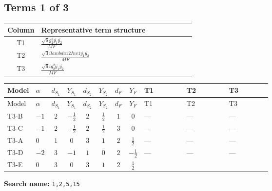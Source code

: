 \documentclass[8pt]{article}
\begin{document}
\begin{landscape}
\subsection*{Terms 1 of 3}
\begin{center}
\begin{tabular}{@{}c >{\raggedright\arraybackslash}p{0.82\linewidth}@{}}
\toprule
Column & Representative term structure \\
\midrule
T1 & \(\displaystyle \frac{\sqrt{6} g_{2}^{2} \overline{y_{1}} \overline{y_{2}}}{MF}\) \\
\midrule
T2 & \(\displaystyle \frac{\sqrt{3} i lambda12Inv1 \overline{y_{1}} \overline{y_{2}}}{MF}\) \\
\midrule
T3 & \(\displaystyle \frac{\sqrt{6} i g_{2}^{2} \overline{y_{1}} \overline{y_{2}}}{MF}\) \\
\midrule
\bottomrule
\end{tabular}
\end{center}
\smallskip
\tiny
\begin{longtable}{@{}llcccccc >{\raggedright\arraybackslash}p{0.21\linewidth} >{\raggedright\arraybackslash}p{0.21\linewidth} >{\raggedright\arraybackslash}p{0.21\linewidth}@{}}
\toprule
Model & $\alpha$ & $d_{S_1}$ & $Y_{S_1}$ & $d_{S_2}$ & $Y_{S_2}$ & $d_F$ & $Y_F$ & T1 & T2 & T3 \\
\midrule
\endfirsthead
\toprule
Model & $\alpha$ & $d_{S_1}$ & $Y_{S_1}$ & $d_{S_2}$ & $Y_{S_2}$ & $d_F$ & $Y_F$ & T1 & T2 & T3 \\
\midrule
\endhead
T3-B & $-1$ & $2$ & $-\frac{1}{2}$ & $2$ & $\frac{1}{2}$ & $1$ & $0$ & --- & --- & --- \\
\midrule
T3-C & $-1$ & $2$ & $-\frac{1}{2}$ & $2$ & $\frac{1}{2}$ & $3$ & $0$ & --- & --- & --- \\
\midrule
T3-A & $0$ & $1$ & $0$ & $3$ & $1$ & $2$ & $\frac{1}{2}$ & --- & --- & --- \\
\midrule
T3-D & $-2$ & $3$ & $-1$ & $1$ & $0$ & $2$ & $-\frac{1}{2}$ & --- & --- & --- \\
\midrule
T3-E & $0$ & $3$ & $0$ & $3$ & $1$ & $2$ & $\frac{1}{2}$ & \scriptsize\adjustbox{max width=\linewidth}{$\begin{gathered} - \frac{\sqrt{6} g_{2}^{2} \overline{y_{1}} \overline{y_{2}}}{6 MF}\end{gathered}$} & \scriptsize\adjustbox{max width=\linewidth}{$\begin{gathered} - \frac{\sqrt{3} i lambda12Inv1 \overline{y_{1}} \overline{y_{2}}}{6 MF}\end{gathered}$} & \scriptsize\adjustbox{max width=\linewidth}{$\begin{gathered} \frac{\sqrt{6} i g_{2}^{2} \overline{y_{1}} \overline{y_{2}}}{6 MF}\end{gathered}$} \\
\midrule
\bottomrule
\end{longtable}
\clearpage
\noindent\textbf{Search name: }\texttt{1,2,5,15}\par\smallskip

\end{landscape}
\end{document}
